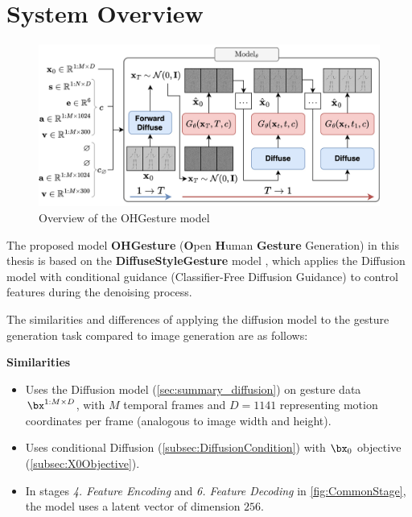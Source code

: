 \section{System Overview}
\label{sec:system_overview}



\begin{figure}[h]
	\centering
	\includegraphics[width=\textwidth]{images/AllStage}
	\caption{Overview of the OHGesture model}
	\label{fig:TrainingAndSampling}
\end{figure}

The proposed model \textbf{OHGesture} (\textbf{O}pen \textbf{H}uman \textbf{Gesture} Generation) in this thesis is based on the \textbf{DiffuseStyleGesture} model \cite{yang2023diffusestylegesture}, which applies the Diffusion model \cite{ho2020denoising} with conditional guidance \cite{ho2022classifier} (Classifier-Free Diffusion Guidance) to control features during the denoising process.

The similarities and differences of applying the diffusion model to the gesture generation task compared to image generation are as follows:

\vspace{10pt}

\textbf{Similarities}
\begin{itemize}
	\item Uses the Diffusion model (\autoref{sec:summary_diffusion}) on gesture data $\bx^{1:M \times D}$, with $M$ temporal frames and $D=1141$ representing motion coordinates per frame (analogous to image width and height).
	\item Uses conditional Diffusion (\autoref{subsec:DiffusionCondition}) with $\bx_0$ objective (\autoref{subsec:X0Objective}).
	\item In stages \textit{4. Feature Encoding} and \textit{6. Feature Decoding} in \autoref{fig:CommonStage}, the model uses a latent vector of dimension $256$.
\end{itemize}

